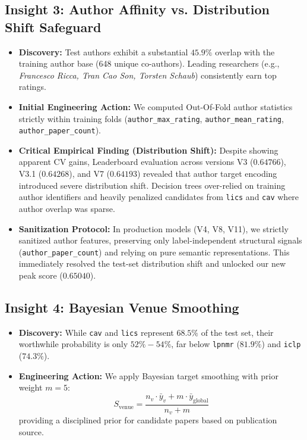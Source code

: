 \subsection{Insight 3: Author Affinity vs. Distribution Shift Safeguard}
\begin{itemize}
  \item \textbf{Discovery:} Test authors exhibit a substantial $\mathbf{45.9\%}$ overlap with the training author base (648 unique co-authors). Leading researchers (e.g., \textit{Francesco Ricca, Tran Cao Son, Torsten Schaub}) consistently earn top ratings.
  \item \textbf{Initial Engineering Action:} We computed Out-Of-Fold author statistics strictly within training folds (\texttt{author\_max\_rating}, \texttt{author\_mean\_rating}, \texttt{author\_paper\_count}).
  \item \textbf{Critical Empirical Finding (Distribution Shift):} Despite showing apparent CV gains, Leaderboard evaluation across versions V3 ($0.64766$), V3.1 ($0.64268$), and V7 ($0.64193$) revealed that author target encoding introduced severe distribution shift. Decision trees over-relied on training author identifiers and heavily penalized candidates from \texttt{lics} and \texttt{cav} where author overlap was sparse. 
  \item \textbf{Sanitization Protocol:} In production models (V4, V8, V11), we strictly sanitized author features, preserving only label-independent structural signals (\texttt{author\_paper\_count}) and relying on pure semantic representations. This immediately resolved the test-set distribution shift and unlocked our new peak score ($0.65040$).
\end{itemize}

\subsection{Insight 4: Bayesian Venue Smoothing}
\begin{itemize}
  \item \textbf{Discovery:} While \texttt{cav} and \texttt{lics} represent $68.5\%$ of the test set, their worthwhile probability is only $52\% - 54\%$, far below \texttt{lpnmr} ($81.9\%$) and \texttt{iclp} ($74.3\%$).
  \item \textbf{Engineering Action:} We apply Bayesian target smoothing with prior weight $m = 5$:
    \begin{equation}
      S_{\text{venue}} = \frac{n_v \cdot \bar{y}_v + m \cdot \bar{y}_{\text{global}}}{n_v + m}
      \label{eq:bayesian_venue}
    \end{equation}
    providing a disciplined prior for candidate papers based on publication source.
\end{itemize}


